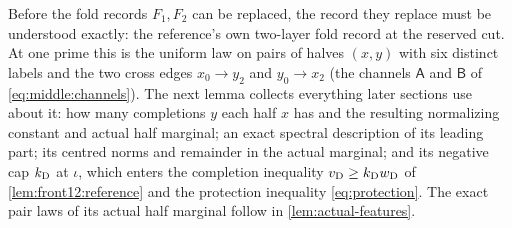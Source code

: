 Before the fold records $F_1,F_2$ can be replaced, the record
they replace must be understood exactly: the reference's own
two-layer fold record at the reserved cut. At one prime this is
the uniform law on pairs of halves $(x,y)$ with six distinct
labels and the two cross edges $x_0\to y_2$ and $y_0\to x_2$ (the
channels $\mathsf A$ and $\mathsf B$ of
\eqref{eq:middle:channels}). The next lemma collects everything
later sections use about it: how many completions $y$ each half
$x$ has and the resulting normalizing constant and actual half
marginal; an exact spectral description of its leading part; its
centred norms and remainder in the actual marginal; and its
negative cap $k_{\rm D}$ at $\iota$, which enters the completion
inequality $v_{\rm D}\ge k_{\rm D}w_{\rm D}$ of
\cref{lem:front12:reference} and the protection inequality
\eqref{eq:protection}. The exact pair laws of its actual half
marginal follow in \cref{lem:actual-features}.

